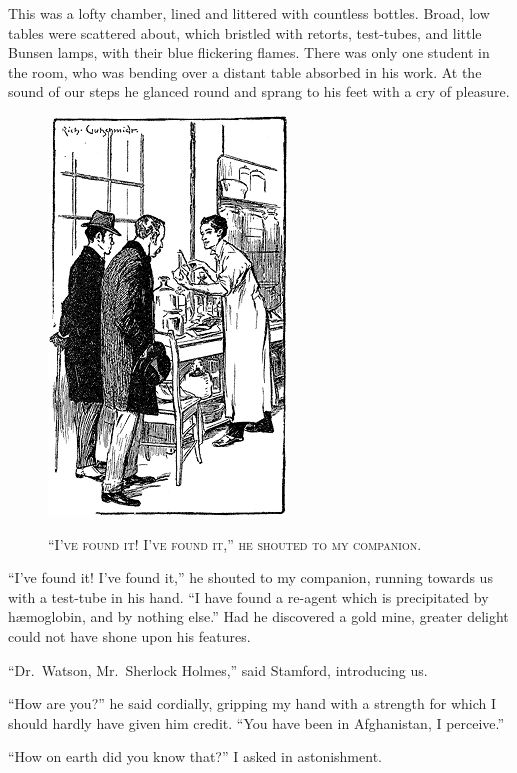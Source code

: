 \documentclass[12pt,english]{book}
\newcommand{\noun}[1]{\textsc{#1}}
\begin{document}
This was a lofty chamber, lined and littered with countless bottles.
Broad, low tables were scattered about, which bristled with retorts,
test-tubes, and little Bunsen lamps, with their blue flickering flames.
There was only one student in the room, who was bending over a distant
table absorbed in his work. At the sound of our steps he glanced round
and sprang to his feet with a cry of pleasure. %
\begin{figure}[htbp]
\noindent \begin{center}\includegraphics{images/study10-stud-02.png}\end{center}

\noindent \begin{center}\noun{{}``I've found it! I've found it,''
he shouted to my companion.}\end{center}
\end{figure}
{}``I've found it! I've found it,'' he shouted to my companion,
running towards us with a test-tube in his hand. {}``I have found
a re-agent which is precipitated by h\ae moglobin, and by nothing
else.'' Had he discovered a gold mine, greater delight could not
have shone upon his features.

{}``Dr.\ Watson, Mr.\ Sherlock Holmes,'' said Stamford, introducing
us.

{}``How are you?'' he said cordially, gripping my hand with a strength
for which I should hardly have given him credit. {}``You have been
in Afghanistan, I perceive.''

{}``How on earth did you know that?'' I asked in astonishment.
\end{document}
